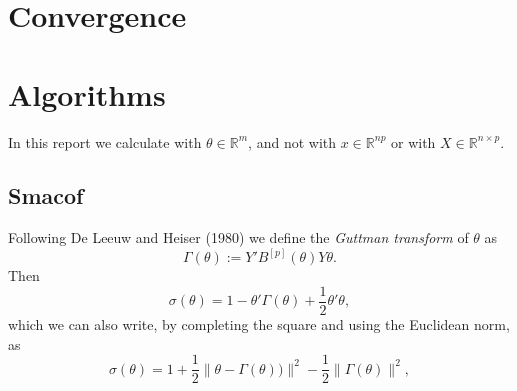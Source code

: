\documentclass[
  12pt,
]{article}
\begin{document}
\section{Convergence}\label{convergence}

\section{Algorithms}\label{algorithms}

In this report we calculate with \(\theta\in\mathbb{R}^m\), and not with \(x\in\mathbb{R}^{np}\)
or with \(X\in\mathbb{R}^{n\times p}\).

\subsection{Smacof}\label{smacof}

Following De Leeuw and Heiser (1980) we define the \emph{Guttman transform} of \(\theta\) as
\begin{equation}
\Gamma(\theta):=Y'B^{[p]}(\theta)Y\theta.
\label{eq:gutdef}
\end{equation}
Then
\begin{equation}
\sigma(\theta)=1-\theta'\Gamma(\theta)+\frac12\theta'\theta,
\label{eq:sdeft2}
\end{equation}
which we can also write, by completing the square and using the Euclidean norm, as
\begin{equation}
\sigma(\theta)=1+\frac12\|\theta-\Gamma(\theta))\|^2-\frac12\|\Gamma(\theta)\|^2,
\label{eq:sdeft3}
\end{equation}
\end{document}
